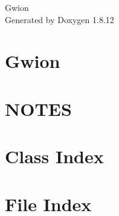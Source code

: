 \documentclass[twoside]{book}
\newcommand{\+}{\discretionary{\mbox{\scriptsize$\hookleftarrow$}}{}{}}
\newcommand{\clearemptydoublepage}{%
  \newpage{\pagestyle{empty}\cleardoublepage}%
}
\begin{document}
\hypersetup{pageanchor=false,
             bookmarksnumbered=true,
             pdfencoding=unicode
            }
\begin{titlepage}
\vspace*{7cm}
\begin{center}%
{\Large Gwion }\\
\vspace*{1cm}
{\large Generated by Doxygen 1.8.12}\\
\end{center}
\end{titlepage}
\clearemptydoublepage
{}
\tableofcontents
\clearemptydoublepage
{}
\hypersetup{pageanchor=true}

\chapter{Gwion}
\label{index}\hypertarget{index}{}
\chapter{N\+O\+T\+ES}
\label{md_NOTES}
\hypertarget{md_NOTES}{}

\chapter{Class Index}

\chapter{File Index}

\end{document}
